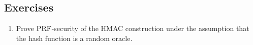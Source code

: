 \subsection*{Exercises}
\begin{enumerate}[label=\textbf{Exercise \thesection.\arabic*}, wide=0pt]
    \item \label{Exercise 1} Prove $\textnormal{PRF}$-security of the HMAC construction under the assumption that the hash function is a random oracle.
\end{enumerate}
